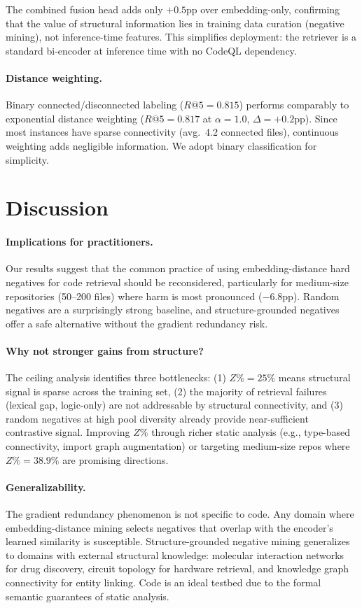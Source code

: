 \documentclass[11pt,a4paper]{article}
\begin{document}
The combined fusion head adds only $+0.5$pp over embedding-only, confirming that the value of structural information lies in training data curation (negative mining), not inference-time features.
This simplifies deployment: the retriever is a standard bi-encoder at inference time with no CodeQL dependency.

\paragraph{Distance weighting.}
Binary connected/disconnected labeling ($R@5{=}0.815$) performs comparably to exponential distance weighting ($R@5{=}0.817$ at $\alpha{=}1.0$, $\Delta{=}+0.2$pp).
Since most instances have sparse connectivity (avg.\ 4.2 connected files), continuous weighting adds negligible information.
We adopt binary classification for simplicity.

\section{Discussion}

\paragraph{Implications for practitioners.}
Our results suggest that the common practice of using embedding-distance hard negatives for code retrieval should be reconsidered, particularly for medium-size repositories (50--200 files) where harm is most pronounced ($-6.8$pp).
Random negatives are a surprisingly strong baseline, and structure-grounded negatives offer a safe alternative without the gradient redundancy risk.

\paragraph{Why not stronger gains from structure?}
The ceiling analysis identifies three bottlenecks: (1) $Z\%{=}25\%$ means structural signal is sparse across the training set, (2) the majority of retrieval failures (lexical gap, logic-only) are not addressable by structural connectivity, and (3) random negatives at high pool diversity already provide near-sufficient contrastive signal.
Improving $Z\%$ through richer static analysis (e.g., type-based connectivity, import graph augmentation) or targeting medium-size repos where $Z\%{=}38.9\%$ are promising directions.

\paragraph{Generalizability.}
The gradient redundancy phenomenon is not specific to code.
Any domain where embedding-distance mining selects negatives that overlap with the encoder's learned similarity is susceptible.
Structure-grounded negative mining generalizes to domains with external structural knowledge: molecular interaction networks for drug discovery, circuit topology for hardware retrieval, and knowledge graph connectivity for entity linking.
Code is an ideal testbed due to the formal semantic guarantees of static analysis.
\end{document}
